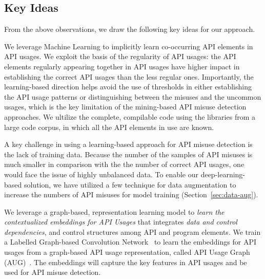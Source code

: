 \subsection{Key Ideas}
\label{sec:key-ideas}

From the above observations, we draw the following key ideas for our
approach.

\begin{key-idea}
We leverage Machine Learning to implicitly learn co-occurring API
elements in API usages. We exploit the basis of the regularity of API
usages: the API elements regularly appearing together in API usages
have higher impact in establishing the correct API usages than the
less regular ones. Importantly, the learning-based direction helps
avoid the use of thresholds in either establishing the API usage
patterns or distinguishing between the misuses and the uncommon
usages, which is the key limitation of the mining-based API misuse
detection approaches. We ultilize the complete, compilable code
using the libraries from a large code corpus, in which all the API
elements in use are known.
\end{key-idea}


\begin{key-idea}
A key challenge in using a learning-based approach for API misuse
detection is the lack of training data. Because the number of the
samples of API misuses is much smaller in comparison with the the
number of correct API usages, one would face the issue of highly
unbalanced data. To enable our deep-learning-based solution, we have
utilized a few technique for data augmentation to increase the numbers
of API misuses for model training
(Section~\ref{sec:data-aug}).
\end{key-idea}


\begin{key-idea} We leverage a graph-based, representation
  learning model to {\em learn the contextualized embeddings for API
    Usages} that integrates {\em data and control dependencies}, and
  control structures among API and program elements. We train a
  Labelled Graph-based Convolution Network~\cite{label-gcn} to learn
  the embeddings for API usages from a graph-based API usage
  representation, called API Usage Graph (AUG)~\cite{msr19}. The
  embeddings will capture the key features in API usages and be used
  for API misuse detection.
\end{key-idea}
